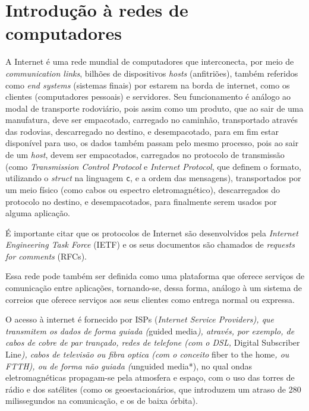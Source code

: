 



\hypertarget{introduuxe7uxe3o-uxe0-redes-de-computadores}{%
\chapter{Introdução à redes de
computadores}\label{introduuxe7uxe3o-uxe0-redes-de-computadores}}

A Internet é uma rede mundial de computadores que interconecta, por meio
de \emph{communication links}, bilhões de dispositivos \emph{hosts}
(anfitriões), também referidos como \emph{end systems} (sistemas finais)
por estarem na borda de internet, como os clientes (computadores
pessoais) e servidores. Seu funcionamento é análogo ao modal de
transporte rodoviário, pois assim como um produto, que ao sair de uma
manufatura, deve ser empacotado, carregado no caminhão, transportado
através das rodovias, descarregado no destino, e desempacotado, para em
fim estar disponível para uso, os dados também passam pelo mesmo
processo, pois ao sair de um \emph{host}, devem ser empacotados,
carregados no protocolo de transmissão (como \emph{Transmission Control
Protocol} e \emph{Internet Protocol}, que definem o formato, utilizando
o \emph{struct} na linguagem \texttt{c}, e a ordem das mensagens),
transportados por um meio físico (como cabos ou espectro
eletromagnético), descarregados do protocolo no destino, e
desempacotados, para finalmente serem usados por alguma aplicação.

É importante citar que os protocolos de Internet são desenvolvidos pela
\emph{Internet Engineering Task Force} (IETF) e os seus documentos são
chamados de \emph{requests for comments} (RFCs).

Essa rede pode também ser definida como uma plataforma que oferece
serviços de comunicação entre aplicações, tornando-se, dessa forma,
análogo à um sistema de correios que oferece serviços aos seus clientes
como entrega normal ou expressa.

O acesso à internet é fornecido por ISPs (\emph{Internet Service
Providers), que transmitem os dados de forma guiada (}guided
media\emph{), através, por exemplo, de cabos de cobre de par trançado,
redes de telefone (com o DSL, }Digital Subscriber Line\emph{), cabos de
televisão ou fibra optica (com o conceito }fiber to the home\emph{, ou
FTTH), ou de forma não guiada (}unguided media*), no qual ondas
eletromagnéticas propagam-se pela atmosfera e espaço, com o uso das
torres de rádio e dos satélites (como os geoestacionários, que
introduzem um atraso de 280 milissegundos na comunicação, e os de baixa
órbita).
